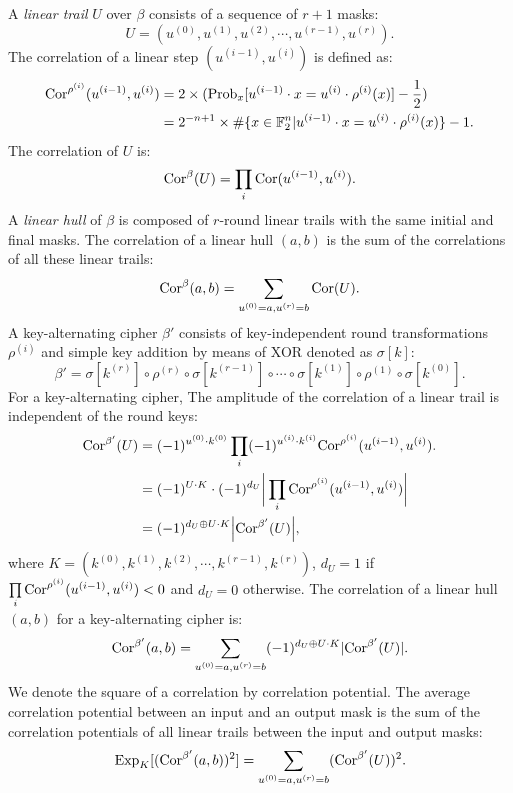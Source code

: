 A \textit{linear trail} $U$ over $\beta$ consists of a sequence of $r+1$ masks:
\[
    U=(u^{(0)},u^{(1)},u^{(2)},\cdots,u^{(r-1)},u^{(r)}).
\]
The correlation of a linear step $(u^{(i-1)},u^{(i)})$ is defined as:
\begin{align*}
    \text{Cor}^{\rho^{(i)}}(u^{(i-1)},u^{(i)})&=2\times(\text{Prob}_x[u^{(i-1)}\cdot x=u^{(i)}\cdot \rho^{(i)}(x)]-\frac{1}{2})\\
    &=2^{-n+1}\times\#\{x\in \mathbb{F}_2^n|u^{(i-1)}\cdot x=u^{(i)}\cdot \rho^{(i)}(x)\}-1.
\end{align*}
The correlation of $U$ is:
\[
    \text{Cor}^{\beta}(U)=\prod\limits_i\text{Cor}(u^{(i-1)},u^{(i)}).
\]
A \textit{linear hull} of $\beta$ is composed of $r$-round linear trails with the same initial and final masks. The correlation of a linear hull $(a,b)$ is the sum of the correlations of all these linear trails:
\[
    \text{Cor}^{\beta}(a,b)=\sum\limits_{u^{(0)}=a,u^{(r)}=b}\text{Cor}(U).
\]
A key-alternating cipher $\beta'$ consists of key-independent round transformations $\rho^{(i)}$ and simple key addition by means of XOR denoted as $\sigma[k]$:
\[
    \beta'=\sigma[k^{(r)}]\circ\rho^{(r)}\circ\sigma[k^{(r-1)}]\circ\cdots\circ\sigma[k^{(1)}]\circ\rho^{(1)}\circ\sigma[k^{(0)}].
\]
For a key-alternating cipher, The amplitude of the correlation of a linear trail is independent of the round keys:
\begin{align*}
    \text{Cor}^{\beta'}(U)&=(-1)^{u^{(0)}\cdot k^{(0)}}\prod\limits_i(-1)^{u^{(i)}\cdot k^{(i)}}\text{Cor}^{\rho^{(i)}}(u^{(i-1)},u^{(i)}).\\
    &=(-1)^{U\cdot K}\cdot(-1)^{d_U}\bigg\lvert\prod\limits_i\text{Cor}^{\rho^{(i)}}(u^{(i-1)},u^{(i)})\bigg\rvert\\
    &=(-1)^{d_U\oplus U\cdot K}\Big\lvert\text{Cor}^{\beta'}(U)\Big\rvert,
\end{align*}
where $K=(k^{(0)},k^{(1)},k^{(2)},\cdots,k^{(r-1)},k^{(r)})$, $d_U=1$ if $\prod\limits_i\text{Cor}^{\rho^{(i)}}(u^{(i-1)},u^{(i)})<0$ and $d_U=0$ otherwise. The correlation of a linear hull $(a,b)$ for a key-alternating cipher is:
\[
    \text{Cor}^{\beta'}(a,b)=\sum\limits_{u^{(0)}=a,u^{(r)}=b}(-1)^{d_U\oplus U\cdot K}\lvert\text{Cor}^{\beta'}(U)\rvert.
\]
We denote the square of a correlation by correlation potential. The average correlation potential between an input and an output mask is the sum of the correlation potentials of all linear trails between the input and output masks:
\[
    \text{Exp}_{K}[(\text{Cor}^{\beta'}(a,b))^2]=\sum\limits_{u^{(0)}=a,u^{(r)}=b}(\text{Cor}^{\beta'}(U))^2.
\]

